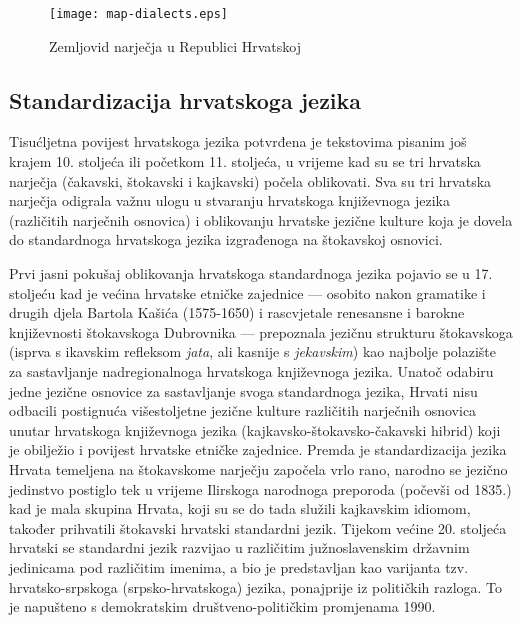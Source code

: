 \begin{multicols}{2}
\begin{figure*}[htb]
  \center
  \texttt{[image: map-dialects.eps]}
  \caption{Zemljovid narječja u Republici Hrvatskoj}
  \label{fig:zemljovid}
\end{figure*}

\subsection{Standardizacija hrvatskoga jezika}

Tisućljetna povijest hrvatskoga jezika potvrđena je tekstovima pisanim još krajem 10. stoljeća ili početkom 11. stoljeća, u vrijeme kad su se tri hrvatska narječja (čakavski, štokavski i kajkavski) počela oblikovati. Sva su tri hrvatska narječja odigrala važnu ulogu u stvaranju hrvatskoga književnoga jezika (različitih narječnih osnovica) i oblikovanju hrvatske jezične kulture koja je dovela do standardnoga hrvatskoga jezika izgrađenoga na štokavskoj osnovici.


Prvi jasni pokušaj oblikovanja hrvatskoga standardnoga jezika pojavio se u 17. stoljeću kad je većina hrvatske etničke zajednice — osobito nakon gramatike i drugih djela Bartola Kašića (1575-1650) i rascvjetale renesansne i barokne književnosti štokavskoga Dubrovnika — prepoznala jezičnu strukturu štokavskoga (isprva s ikavskim refleksom \emph{jata}, ali kasnije s \emph{jekavskim}) kao najbolje polazište za sastavljanje nadregionalnoga hrvatskoga književnoga jezika. Unatoč odabiru jedne jezične osnovice za sastavljanje svoga standardnoga jezika, Hrvati nisu odbacili postignuća višestoljetne jezične kulture različitih narječnih osnovica unutar hrvatskoga književnoga jezika (kajkavsko-štokavsko-čakavski hibrid) koji je obilježio i povijest hrvatske etničke zajednice. Premda je standardizacija jezika Hrvata temeljena na štokavskome narječju započela vrlo rano, narodno se jezično jedinstvo postiglo tek u vrijeme Ilirskoga narodnoga preporoda (počevši od 1835.) kad je mala skupina Hrvata, koji su se do tada služili kajkavskim idiomom, također prihvatili štokavski hrvatski standardni jezik. Tijekom većine 20. stoljeća hrvatski se standardni jezik razvijao u različitim južnoslavenskim državnim jedinicama pod različitim imenima, a bio je predstavljan kao varijanta tzv. hrvatsko-srpskoga (srpsko-hrvatskoga) jezika, ponajprije iz političkih razloga. To je napušteno s demokratskim društveno-političkim promjenama 1990.


\end{multicols}

